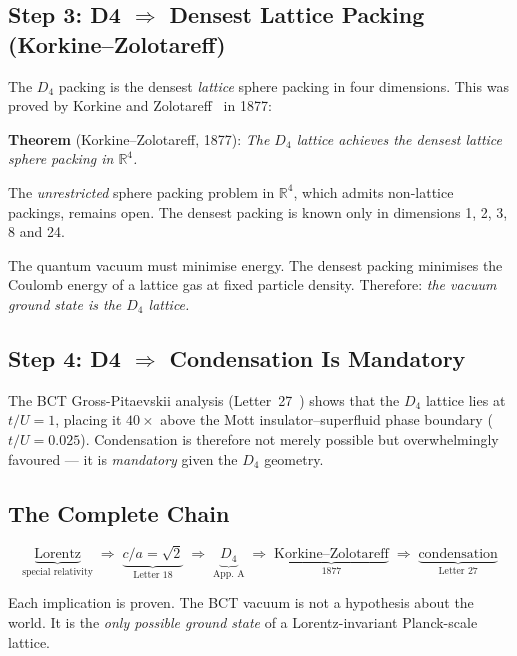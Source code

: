 \documentclass[aps,prl,twocolumn,showpacs,preprintnumbers]{revtex4-2}
\begin{document}
\subsection{Step 3: D4 $\Rightarrow$ Densest Lattice Packing (Korkine--Zolotareff)}

The $D_4$ packing is the densest \emph{lattice} sphere packing in four
dimensions. This was proved by Korkine and
Zolotareff~\cite{korkine} in 1877:

\textbf{Theorem} (Korkine--Zolotareff, 1877): \textit{The $D_4$ lattice
achieves the densest lattice sphere packing in $\mathbb{R}^4$.}

The \emph{unrestricted} sphere packing problem in $\mathbb{R}^4$, which
admits non-lattice packings, remains open. The densest packing is known
only in dimensions 1, 2, 3, 8 and 24.

The quantum vacuum must minimise energy. The densest packing minimises
the Coulomb energy of a lattice gas at fixed particle density.
Therefore: \emph{the vacuum ground state is the $D_4$ lattice.}

\subsection{Step 4: D4 $\Rightarrow$ Condensation Is Mandatory}

The BCT Gross-Pitaevskii analysis (Letter~27~\cite{letter27}) shows
that the $D_4$ lattice lies at $t/U = 1$, placing it $40\times$
above the Mott insulator--superfluid phase boundary ($t/U = 0.025$).
Condensation is therefore not merely possible but overwhelmingly
favoured --- it is \emph{mandatory} given the $D_4$ geometry.

\subsection{The Complete Chain}

\begin{equation}
  \underbrace{\text{Lorentz}}_{\text{special relativity}}
  \;\Rightarrow\;
  \underbrace{c/a = \sqrt{2}}_{\text{Letter 18}}
  \;\Rightarrow\;
  \underbrace{D_4}_{\text{App. A}}
  \;\Rightarrow\;
  \underbrace{\text{Korkine--Zolotareff}}_{\text{1877}}
  \;\Rightarrow\;
  \underbrace{\text{condensation}}_{\text{Letter 27}}
  \label{eq:chain}
\end{equation}

Each implication is proven. The BCT vacuum is not a hypothesis
about the world. It is the \emph{only possible ground state} of
a Lorentz-invariant Planck-scale lattice.
\end{document}
